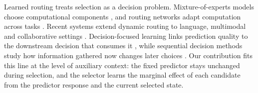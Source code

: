 Learned routing treats selection as a decision problem. Mixture-of-experts
models choose computational components
\citep{jacobs1991adaptive,shazeer2017outrageously,zhou2022mixture,fedus2022switch},
and routing networks adapt computation across tasks
\citep{rosenbaum2018routing,ma2018modeling}. Recent systems extend dynamic
routing to language, multimodal and collaborative settings
\citep{failuremode2026routing,dream2026routing,cogmoe2026sparse}.
Decision-focused learning links prediction quality to the downstream decision
that consumes it
\citep{bertsimas2020predictive,elmachtoub2022smart,wilder2019melding,mandi2024decision,donti2017task},
while sequential decision methods study how information gathered now changes
later choices \citep{auer2002finite,dudik2011doubly}. Our contribution fits
this line at the level of auxiliary context: the fixed predictor stays unchanged
during selection, and the selector learns the marginal effect of each candidate
from the predictor response and the current selected state.
